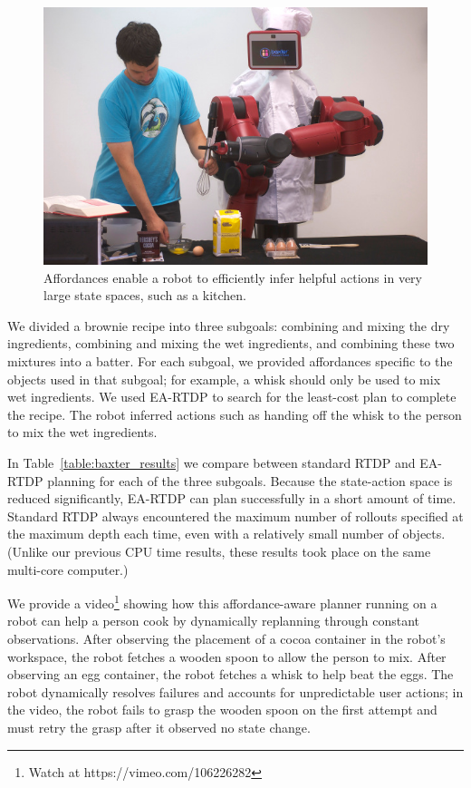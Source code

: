 \documentclass[letterpaper]{article}
\begin{document}

\begin{figure}[b]
\centering
\includegraphics[width=0.75\linewidth]{figures/baxter_scaled.jpg}%
  \caption{Affordances enable a robot to efficiently infer helpful actions in
    very large state spaces, such as a kitchen.}
  \label{fig:baxter_results}
\end{figure}

We divided a brownie recipe into three subgoals: combining and mixing
the dry ingredients, combining and mixing the wet ingredients, and
combining these two mixtures into a batter. For each subgoal, we
provided affordances specific to the objects used in that subgoal; for
example, a whisk should only be used to mix wet ingredients.  We used
EA-RTDP to search for the least-cost plan to complete the recipe.  The
robot inferred actions such as handing off the whisk to the person to
mix the wet ingredients.


In Table~\ref{table:baxter_results} we compare between standard RTDP
and EA-RTDP planning for each of the three subgoals. Because the
state-action space is reduced significantly, EA-RTDP can plan
successfully in a short amount of time. Standard RTDP always
encountered the maximum number of rollouts specified at the maximum
depth each time, even with a relatively small number of objects.
(Unlike our previous CPU time results, these results took place on the
same multi-core computer.)

We provide a video\footnote{Watch at https://vimeo.com/106226282} 
showing how this affordance-aware planner running
on a robot can help a person cook by dynamically replanning through
constant observations. After observing the placement of a cocoa
container in the robot's workspace, the robot fetches a wooden spoon
to allow the person to mix. After observing an egg container, the
robot fetches a whisk to help beat the eggs. 
The robot dynamically resolves failures and accounts for unpredictable
user actions; in the video, the robot fails to grasp the wooden spoon on
the first attempt and must retry the grasp after it observed no state
change.
\end{document}
